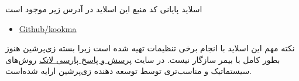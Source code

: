\documentclass[xcolor=dvipsnames, professionalfonts, aspectratio=169, 11pt]{beamer}
\makeatletter
\newcommand{ \RTList}{\raggedleft\rightskip\@totalleftmargin}
\makeatother
\begin{document}
\begin{persian}
\begin{frame}{اسلاید پایانی}
کد منبع این اسلاید در آدرس زیر موجود است
\begin{itemize}\RTList
	\item \href{https://github.com/kookma/Persian-Beamer-Templates}{Github/kookma}
\end{itemize}

\begin{alertblock}{نکته مهم}
	این اسلاید با انجام برخی تنظیمات تهیه شده است زیرا بسته زی‌پرشین هنوز بطور کامل با بیمر سازگار نیست. در سایت 
	\href{http://qa.parsilatex.com}{پرسش و پاسخ پارسی لاتک}
 روش‌های سیستماتیک و مناسب‌تری توسط توسعه دهنده زی‌پرشین ارایه شده‌است.
\end{alertblock}


\end{frame}

\end{persian}
\end{document}
